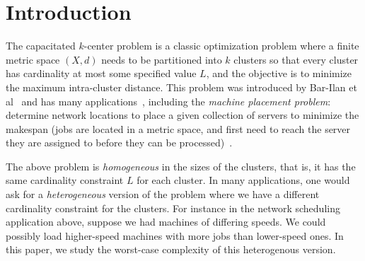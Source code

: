 \section{Introduction}
The capacitated $k$-center problem is a classic optimization problem where a finite metric space $(X,d)$ needs to be partitioned into $k$ clusters so that  every  cluster has cardinality at most
some specified value $L$, and the objective is to minimize the maximum intra-cluster distance. This problem was introduced by Bar-Ilan et al~\cite{Bar-IlanKP93} and has many applications~\cite{LuptonMY98,MorganL77,Murthy1983AnAA}, including %
the {\em machine placement problem}: determine network locations to place a given collection of servers  to minimize the makespan (jobs are located in a metric space, and first need to reach the server they are assigned to before they can be processed)~\cite{PSW97}. %

The above problem is {\em homogeneous} in the sizes of the clusters, that is, it has the same cardinality constraint $L$ for each cluster. In many applications, one would ask for a \emph{heterogeneous} version of the problem where we have a different cardinality constraint for the clusters.
For instance in the network scheduling application above, suppose we had machines of differing speeds. We could possibly load higher-speed machines with more jobs than lower-speed ones. In this paper, we study  the worst-case complexity of this heterogenous version.

